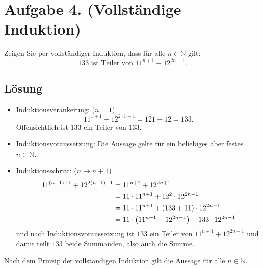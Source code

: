 \documentclass[german,12pt]{homework}
\newcommand{\NN}{\mathbb{N}}
\DeclarePairedDelimiter{\enbrace}{(}{)}
\begin{document}
    \section*{Aufgabe 4. (Vollständige Induktion)}

    \begin{problem}
        Zeigen Sie per vollständiger Induktion, dass für alle \(n \in \NN\)
        gilt:
        \[133\text{ ist Teiler von }11^{n + 1} + 12^{2n - 1}.\]
    \end{problem}

    \subsection*{Lösung}
    \begin{itemize}
        \item Induktionsverankerung: (\(n = 1\))
        \[11^{1 + 1} + 12^{2 \cdot 1 - 1} = 121 + 12 = 133.\]
        Offensichtlich ist \(133\) ein Teiler von \(133\).
        \item Induktionsvoraussetzung: Die Aussage gelte für ein beliebiges
        aber festes \(n \in \NN\).
        \item Induktionsschritt: (\(n \to n + 1\))
        \begin{align*}
            11^{\enbrace*{n + 1} + 1} + 12^{2\enbrace*{n + 1} - 1} &= 11^{n +
            2} + 12^{2n + 1}\\
            &= 11 \cdot 11^{n + 1} + 12^2 \cdot 12^{2n - 1}\\
            &= 11 \cdot 11^{n + 1} + \enbrace*{133 + 11} \cdot 12^{2n - 1}\\
            &= 11 \cdot \enbrace*{11^{n + 1} + 12^{2n - 1}} + 133 \cdot 12^{2n
            - 1}
        \end{align*}
        und nach Induktionsvoraussetzung ist \(133\) ein Teiler von \(11^{n +
        1} + 12^{2n - 1}\) und damit teilt \(133\) beide Summanden, also auch
        die Summe.
    \end{itemize}
    Nach dem Prinzip der vollständigen Induktion gilt die Aussage für alle \(n
    \in \NN\).
\end{document}
